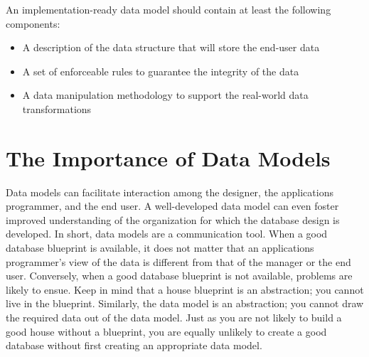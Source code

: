 \documentclass[a4paper, 12pt, titlepage]{report}
\begin{document}
An implementation-ready data model should contain at least the following components:
\begin{itemize}
\item A description of the data structure that will store the end-user data
\item A set of enforceable rules to guarantee the integrity of the data
\item A data manipulation methodology to support the real-world data transformations
\end{itemize}
\section{The Importance of Data Models}
Data models can facilitate interaction among the designer, the applications programmer, and the end user. A well-developed data model can even foster improved understanding of the organization for which the database design is developed. In short, data models are a communication tool. When a good database blueprint is available, it does not matter that an applications programmer’s view of the data is different from that of the manager or the end user. Conversely, when a good database blueprint is not available, problems are likely to ensue. Keep in mind that a house blueprint is an abstraction; you cannot live in the blueprint. Similarly, the data model is an abstraction; you cannot draw the required data out of the data model. Just as you are not likely to build a good house without a blueprint, you are equally unlikely to create a good database without first creating an appropriate data model.
\end{document}
